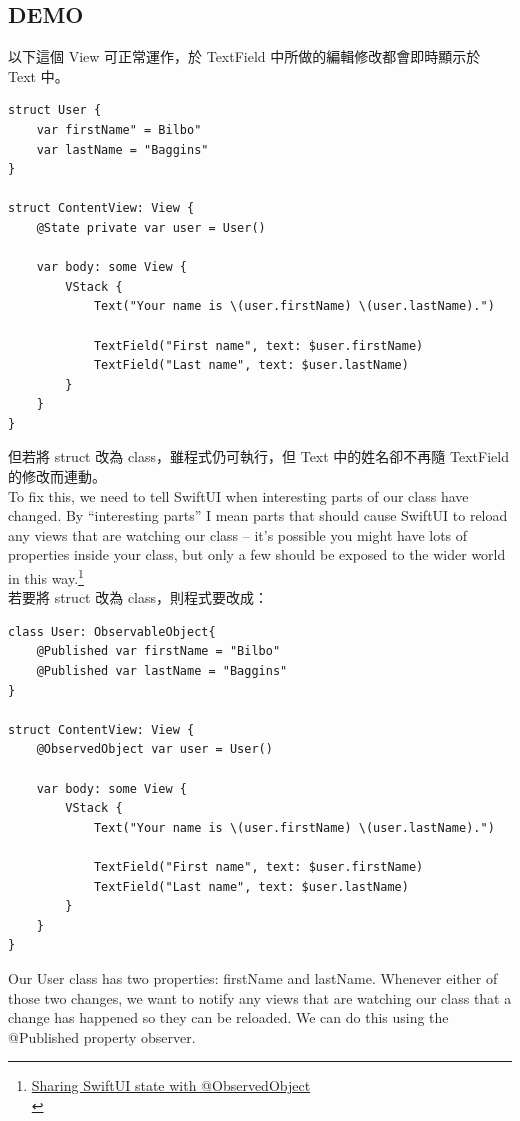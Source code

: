 \documentclass[a4paper,12pt]{article}
\begin{document}
\subsection{DEMO}
\label{sec:org43ef412}
以下這個 View 可正常運作，於 TextField 中所做的編輯修改都會即時顯示於 Text 中。\\
\lstset{breaklines=true,language=swift,label= ,caption= ,captionpos=b,firstnumber=1,numbers=left}
\begin{lstlisting}
struct User {
    var firstName" = Bilbo"
    var lastName = "Baggins"
}

struct ContentView: View {
    @State private var user = User()

    var body: some View {
        VStack {
            Text("Your name is \(user.firstName) \(user.lastName).")

            TextField("First name", text: $user.firstName)
            TextField("Last name", text: $user.lastName)
        }
    }
}
\end{lstlisting}
但若將 struct 改為 class，雖程式仍可執行，但 Text 中的姓名卻不再隨 TextField 的修改而連動。\\
To fix this, we need to tell SwiftUI when interesting parts of our class have changed. By “interesting parts” I mean parts that should cause SwiftUI to reload any views that are watching our class – it’s possible you might have lots of properties inside your class, but only a few should be exposed to the wider world in this way.\footnote{\href{https://www.hackingwithswift.com/books/ios-swiftui/sharing-swiftui-state-with-observedobject}{Sharing SwiftUI state with @ObservedObject}\\}\\
若要將 struct 改為 class，則程式要改成：\\
\lstset{breaklines=true,language=swift,label= ,caption= ,captionpos=b,firstnumber=1,numbers=left}
\begin{lstlisting}
class User: ObservableObject{
    @Published var firstName = "Bilbo"
    @Published var lastName = "Baggins"
}

struct ContentView: View {
    @ObservedObject var user = User()

    var body: some View {
        VStack {
            Text("Your name is \(user.firstName) \(user.lastName).")

            TextField("First name", text: $user.firstName)
            TextField("Last name", text: $user.lastName)
        }
    }
}
\end{lstlisting}
Our User class has two properties: firstName and lastName. Whenever either of those two changes, we want to notify any views that are watching our class that a change has happened so they can be reloaded. We can do this using the @Published property observer.\\
\end{document}
